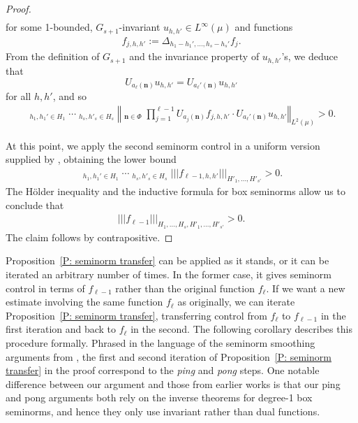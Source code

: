 \documentclass[11pt]{amsart}
\theoremstyle{definition}
\DeclareMathOperator*{\oE}{\overline{\mathbb{E}}}
\newcommand{\bn}{{\mathbf{n}}}
\newcommand{\norm}[1]{\left\Vert #1\right\Vert}
\newcommand{\nnorm}[1]{\lvert\!|\!| #1|\!|\!\rvert}
\newcommand{\1}{{\mathbf{1}}}
\begin{document}
\begin{proof}
\begin{align*}
    \end{align*}
    for some 1-bounded, $G_{s+1}$-invariant $u_{h,h'}\in L^\infty(\mu)$ and functions
    \begin{align*}
        f_{j,h,h'}:=\Delta_{h_1-h_1', \ldots, h_s-h_s'}f_j.
    \end{align*}
    From the definition of $G_{s+1}$ and the invariance property of $u_{h,h'}$'s, we deduce that $$U_{a_\ell(\bn)}u_{h,h'} = U_{a_\ell'(\bn)}u_{h,h'}$$ for all $h,h'$, and so
    \begin{align*}
       \oE_{h_1,h_1'\in H_1} \cdots \oE_{h_s,h'_s\in H_{s}}\norm{\oE_{\bn\in\Phi}\prod_{j=1}^{\ell-1} U_{a_j(\bn)}f_{j,h,h'}\cdot U_{a_\ell'(\bn)}u_{h,h'}}_{L^2(\mu)} > 0.
    \end{align*}
    
    At this point, we apply the second seminorm control in a uniform version supplied by \cite[Proposition~A.2]{FrKu22a}, obtaining the lower bound
    \begin{align*}
        \oE_{h_1,h_1'\in H_1} \cdots \oE_{h_s,h'_s\in H_{s}}\nnorm{f_{\ell-1,h,h'}}_{H'_1, \ldots, H'_{s'}}>0.
    \end{align*}
    The H\"older inequality and the inductive formula for box seminorms allow us to conclude that 
    \begin{align*}
        \nnorm{f_{\ell-1}}_{H_1, \ldots, H_{s}, H'_1, \ldots, H'_{s'}}>0.
    \end{align*}
    The claim follows by contrapositive.
\end{proof}
Proposition~\ref{P: seminorm transfer} can be applied as it stands, or it can be iterated an arbitrary number of times. In the former case, it gives seminorm control in terms of $f_{\ell-1}$ rather than the original function $f_\ell$. If we want a new estimate involving the same function $f_\ell$ as originally, we can iterate Proposition~\ref{P: seminorm transfer}, transferring control from $f_\ell$ to $f_{\ell-1}$ in the first iteration and back to $f_\ell$ in the second. The following corollary describes this procedure formally. 
Phrased in the language of the seminorm smoothing arguments from \cite{DKKST25, DKKST24, FrKu22b, FrKu22a, Kuc23}, the first and second iteration of Proposition~\ref{P: seminorm transfer} in the proof correspond to the \textit{ping} and \textit{pong} steps. {One notable difference between our argument and those from earlier works is that our ping and pong arguments both rely on the inverse theorems for degree-1 box seminorms, and hence they only use invariant rather than dual functions.} 
\end{document}
